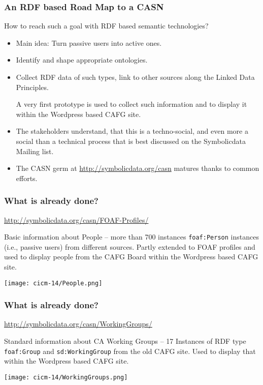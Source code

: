 \documentclass{beamer}
\begin{document}
\begin{frame}\frametitle{An RDF based Road Map to a CASN}
How to reach such a goal with RDF based semantic technologies?
\begin{itemize}
\item Main idea: Turn passive users into active ones.
\item Identify and shape appropriate ontologies. 
\item Collect RDF data of such types, link to other sources along the Linked
  Data Principles.

  A very first prototype is used to collect such information and to display
  it within the Wordpress based CAFG site.
\item The stakeholders understand, that this is a techno-social, and even more
  a social than a technical process that is best discussed on the Symbolicdata
  Mailing list.
\item The CASN germ at \url{http://symbolicdata.org/casn} matures thanks to
  common efforts.
\end{itemize}
\end{frame}

\begin{frame}\frametitle{What is already done? }\small

  \begin{center}
    \url{http://symbolicdata.org/casn/FOAF-Profiles/}
  \end{center}

Basic information about People -- more than 700 instances \texttt{foaf:Person}
instances (i.e., passive users) from different sources.  Partly extended to
FOAF profiles and used to display people from the CAFG Board within the
Wordpress based CAFG site.

\begin{center}
  \texttt{[image: cicm-14/People.png]}
\end{center}
\end{frame}

\begin{frame}\frametitle{What is already done?}\small

  \begin{center}
    \url{http://symbolicdata.org/casn/WorkingGroups/}
  \end{center}

Standard information about CA Working Groups -- 17 Instances of RDF type
\texttt{foaf:Group} and \texttt{sd:WorkingGroup} from the old CAFG site.  Used
to display that within the Wordpress based CAFG site.

\begin{center}
  \texttt{[image: cicm-14/WorkingGroups.png]}
\end{center}
\end{frame}
\end{document}
